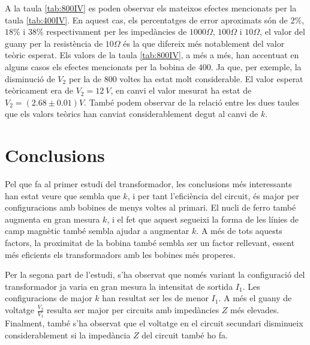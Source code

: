 A la taula \cref{tab:800IV} es poden observar els mateixos efectes mencionats per la taula \cref{tab:400IV}. En aquest cas, els percentatges de error aproximats són de $2\%$, $18\%$ i $38\%$ respectivament per les impedàncies de $1000\si{\Omega}$,  $100\si{\Omega}$  i  $10\si{\Omega}$, el valor del guany per la resistència de $10\si{\Omega}$ és la que difereix més notablement del valor teòric esperat. Els valors de la taula \cref{tab:800IV}, a més a més, han accentuat en alguns casos els efectes mencionats per la bobina de $400$. Ja que, per exemple, la disminució de $V_2$  per la de $800$ voltes ha estat molt considerable. El valor esperat teòricament era de $V_2=\SI{12}{V}$, en canvi el valor mesurat ha estat de $V_2=(2.68 \pm 0.01) \si{V}$. També podem observar de la relació entre les dues taules que els valors teòrics han canviat considerablement degut al canvi de $k$. 

\section{Conclusions}

Pel que fa al primer estudi del transformador, les conclusions més interessants han estat veure que sembla que $k$, i per tant l'eficiència del circuit, és major per configuracions amb bobines de menys voltes al primari. El nucli de ferro també augmenta en gran mesura $k$, i el fet que aquest segueixi la forma de les línies de camp magnètic també sembla ajudar a augmentar $k$. A més de tots aquests factors, la proximitat de la bobina també sembla ser un factor rellevant, essent més eficients els transformadors amb les bobines més properes.

Per la segona part de l'estudi, s'ha observat que només variant la configuració del transformador ja varia en gran mesura la intensitat de sortida $I_1$. Les configuracions de major $k$ han resultat ser les de menor $I_1$. A més el guany de voltatge $\frac{V_2}{V_1}$ resulta ser major per circuits amb impedàncies $Z$ més elevades. Finalment, també s'ha observat que el voltatge en el circuit secundari disminueix considerablement si la impedància $Z$ del circuit també ho fa.

